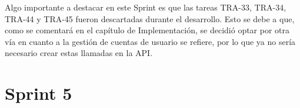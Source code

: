 \begin{table}[H]
\label{TRA-45}
\end{table}

Algo importante a destacar en este Sprint es que las tareas TRA-33, TRA-34, TRA-44 y TRA-45 fueron descartadas durante el desarrollo. Esto se debe a que, como se comentará en el capítulo de Implementación, se decidió optar por otra vía en cuanto a la gestión de cuentas de usuario se refiere, por lo que ya no sería necesario crear estas llamadas en la API.

\section{Sprint 5}

